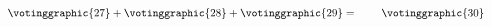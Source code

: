 \begin{ans}{4}
\begin{exparts}
\begin{equation*}
           \votinggraphic{27}  %
           +
           \votinggraphic{28}  %
           +
           \votinggraphic{29}  %
           =\hspace{.30in}
           \votinggraphic{30}  %
           \hspace{.30in}\hbox{}
         \end{equation*}
      \end{exparts}
    
\end{ans}
